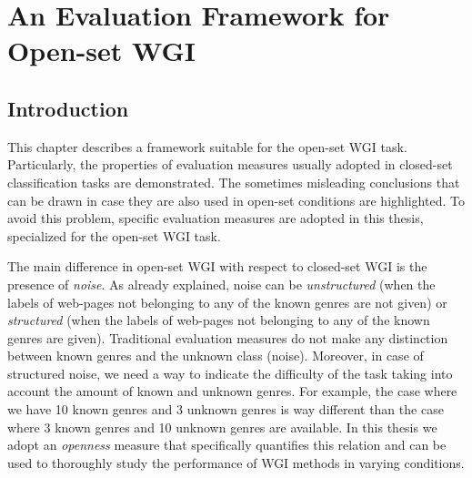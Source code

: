 
\chapter{An Evaluation Framework for Open-set WGI}

\label{chap:eval_methods}


\newcommand{\keyword}[1]{\textbf{#1}}
\newcommand{\tabhead}[1]{\textbf{#1}}
\newcommand{\code}[1]{\texttt{#1}}
\newcommand{\file}[1]{\texttt{\bfseries#1}}
\newcommand{\option}[1]{\texttt{\itshape#1}}


\section{Introduction}\label{chap:eval_methods:sec:intro}

This chapter describes a framework suitable for the open-set WGI task. Particularly, the properties of evaluation measures usually adopted in closed-set classification tasks are demonstrated. The sometimes misleading conclusions that can be drawn in case they are also used in open-set conditions are highlighted. To avoid this problem, specific evaluation measures are adopted in this thesis, specialized for the open-set WGI task.

The main difference in open-set WGI with respect to closed-set WGI is the presence of \emph{noise}. As already explained, noise can be \textit{unstructured} (when the labels of web-pages not belonging to any of the known genres are not given) or \textit{structured} (when the labels of web-pages not belonging to any of the known genres are given). Traditional evaluation measures do not make any distinction between known genres and the unknown class (noise). Moreover, in case of structured noise, we need a way to indicate the difficulty of the task taking into account the amount of known and unknown genres. For example, the case where we have 10 known genres and 3 unknown genres is way different than the case where 3 known genres and 10 unknown genres are available. In this thesis we adopt an \textit{openness} measure that specifically quantifies this relation and can be used to thoroughly study the performance of WGI methods in varying conditions.

